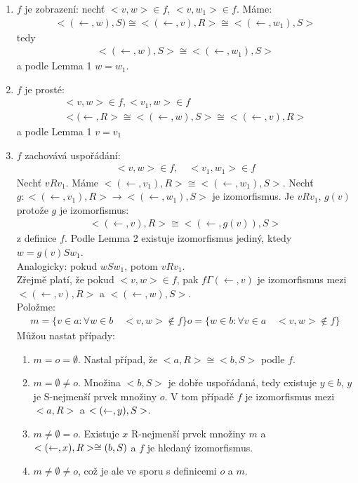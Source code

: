 \documentclass[a4paper,12pt,titlepage]{article}
\begin{document}
\begin{enumerate}
\item
$f$ je zobrazení: nechť $<v,w> \in f$, $<v,w_1> \in f$.
Máme:
\begin{align}
	<(\leftarrow, w), S) \cong <(\leftarrow, v), R> \cong <(\leftarrow, w_1), S>
\end{align}
tedy 
\begin{align}
	<(\leftarrow, w), S> \cong <(\leftarrow, w_1), S>
\end{align}
a podle Lemma 1 $w = w_1$.
\item
$f$ je prosté:
\begin{align}
	<v,w> \in f, <v_1,w> \in f \\
	<(\leftarrow, R> \cong <(\leftarrow, w),S> \cong <(\leftarrow, v), R>
\end{align}
a podle Lemma 1 $v = v_1$
\item
$f$ zachovává uspořádání:
\begin{align}
	<v,w> \in f, \quad <v_1, w_1> \in f
\end{align}
Nechť $v R v_1$. Máme $<(\leftarrow, v_1), R> \cong <(\leftarrow, w_1), S>$.
Nechť $g: <(\leftarrow, v_1), R> \to <(\leftarrow, w_1),S>$ je izomorfismus. 
Je $v R v_1$, $g(v)$ protože $g$ je izomorfismus:
\begin{align}
	<(\leftarrow,v), R> \cong <(\leftarrow, g(v)), S>
\end{align}
z definice $f$. Podle Lemma 2 existuje izomorfismus jediný, ktedy $w = g(v) S
w_1$. \\
Analogicky: pokud $w S w_1$, potom $v R v_1$. \\
Zřejmě platí, že pokud $<v,w> \in f$, pak $f \Gamma (\leftarrow, v)$ je izomorfismus
mezi $<(\leftarrow,v), R>$ a $<(\leftarrow,w), S>$.\\
Položme: 
\begin{align}
	m = \{ v \in a : \forall w \in b \quad <v,w> \nin f \}
	o = \{ w \in b : \forall v \in a \quad <v,w> \nin f \}
\end{align}
Můžou nastat případy:
\begin{enumerate}
	\item $m = o = \emptyset$.  Nastal případ, že $<a, R> \cong <b,S>$ podle $f$.
	\item $m = \emptyset \neq o$. Množina $<b,S>$ je dobře uspořádaná, tedy
	existuje $y \in b$, $y$ je S-nejmenší prvek množiny $o$. V tom případě $f$ je
	izomorfismus mezi $<a,R>$ a $<(\leftarrow, y), S>$.
	\item $m \neq \emptyset = o$. Existuje $x$ R-nejmenší prvek množiny $m$ a
	$<(\leftarrow, x), R> \cong (b,S)$ a $f$ je hledaný izomorfismus.
	\item $m \neq \emptyset \neq o$, což je ale ve sporu s definicemi $o$ a $m$.
\end{enumerate}
\end{enumerate}
\end{document}
